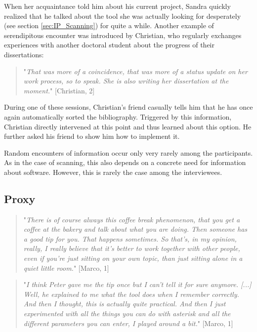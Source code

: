 \documentclass[12pt, a4paper, titlepage, oneside, abstract=true, toc=listof, toc=bibliography]{scrreprt}
\begin{document}
{When her acquaintance told him about his current project, Sandra quickly realized that he talked about the tool she was actually looking for desperately (see section \ref{sec:IP_Scanning}) for quite a while. Another example of serendipitous encounter was introduced by Christian, who regularly exchanges experiences with another doctoral student about the progress of their dissertations:

\begin{quotation}
"\textit{That was more of a coincidence, that was more of a status update on her work process, so to speak. She is also writing her dissertation at the moment.}" [Christian, 2]
\end{quotation}

During one of these sessions, Christian's friend casually tells him that he has once again automatically sorted the bibliography. Triggered by this information, Christian directly intervened at this point and thus learned about this option. He further asked his friend to show him how to implement it. 

Random encounters of information occur only very rarely among the participants. As in the case of scanning, this also depends on a concrete need for information about software. However, this is rarely the case among the interviewees. 

\subsection{Proxy}
\label{sec:IP_Proxy}
%
\begin{quotation}
"\textit{There is of course always this coffee break phenomenon, that you get a coffee at the bakery and talk about what you are doing. Then someone has a good tip for you. That happens sometimes. So that's, in my opinion, really, I really believe that it's better to work together with other people, even if you're just sitting on your own topic, than just sitting alone in a quiet little room.}" [Marco, 1]
\end{quotation} 

\begin{quotation}
"\textit{I think Peter gave me the tip once but I can't tell it for sure anymore. [...] Well, he explained to me what the tool does when I remember correctly. And then I thought, this is actually quite practical. And then I just experimented with all the things you can do with asterisk and all the different parameters you can enter, I played around a bit.}" [Marco, 1]
\end{quotation}


}
\end{document}
